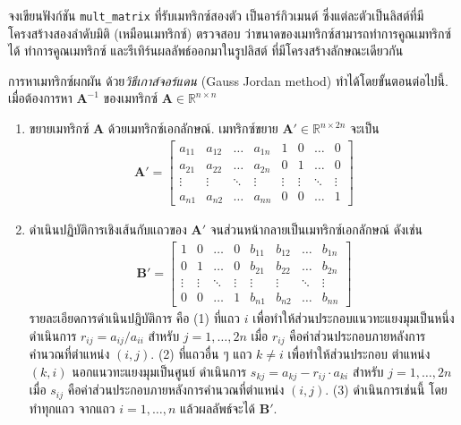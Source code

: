\begin{Exercise}
	\label{ex: linalg matrix mult python}
	
	จงเขียนฟังก์ชัน \verb|mult_matrix| ที่รับเมทริกซ์สองตัว 
	เป็นอาร์กิวเมนต์ ซึ่งแต่ละตัวเป็นลิสต์ที่มีโครงสร้างสองลำดับมิติ (เหมือนเมทริกซ์)
	ตรวจสอบ
	ว่าขนาดของเมทริกซ์สามารถทำการคูณเมทริกซ์ได้
	ทำการคูณเมทริกซ์
	และรีเทิร์นผลลัพธ์ออกมาในรูปลิสต์
	ที่มีโครงสร้างลักษณะเดียวกัน
	
\end{Exercise}


\begin{Exercise}
	\label{ex: linalg mat inverse}
	การหาเมทริกซ์ผกผัน ด้วย\textit{วิธีเกาส์จอร์แดน} (Gauss Jordan method) ทำได้โดยขั้นตอนต่อไปนี้.
	เมื่อต้องการหา $\bm{A}^{-1}$ ของเมทริกซ์ $\bm{A} \in \mathbb{R}^{n \times n}$
	\begin{enumerate}
		\item ขยายเมทริกซ์ $\bm{A}$ ด้วยเมทริกซ์เอกลักษณ์.
		เมทริกซ์ขยาย $\bm{A}' \in \mathbb{R}^{n \times 2n}$ จะเป็น
		\begin{eqnarray}
		\bm{A}' = \begin{bmatrix}
		a_{11} & a_{12} & \ldots & a_{1n} & 1 & 0 & \ldots & 0
		\\
		a_{21} & a_{22} & \ldots & a_{2n} & 0 & 1 & \ldots & 0
		\\
		\vdots & \vdots & \ddots & \vdots &
		\vdots & \vdots &
		\ddots & \vdots 
		\\
		a_{n1} & a_{n2} & \ldots & a_{nn} & 0 & 0 & \ldots & 1		
		\end{bmatrix}
		\label{eq: augmented matrix}
		\end{eqnarray}
		\item ดำเนินปฏิบัติการเชิงเส้นกับแถวของ $\bm{A}'$ 
		จนส่วนหน้ากลายเป็นเมทริกซ์เอกลักษณ์ ดังเช่น
		\begin{eqnarray}
		\bm{B}' = \begin{bmatrix}
		1 & 0 & \ldots & 0
		&
		b_{11} & b_{12} & \ldots & b_{1n} 
		\\
		0 & 1 & \ldots & 0
		&
		b_{21} & b_{22} & \ldots & b_{2n}
		\\
		\vdots & \vdots & \ddots & \vdots &
		\vdots & \vdots &
		\ddots & \vdots 
		\\
		0 & 0 & \ldots & 1
		&
		b_{n1} & b_{n2} & \ldots & b_{nn}		
		\end{bmatrix}
		\label{eq: linear transformed augmented matrix}
		\end{eqnarray}
		รายละเอียดการดำเนินปฎิบัติการ
		คือ 
		(1) 
		ที่แถว $i$ 
		เพื่อทำให้ส่วนประกอบแนวทะแยงมุมเป็นหนึ่ง
		ดำเนินการ $r_{ij} = a_{ij}/a_{ii}$ สำหรับ $j = 1, \ldots, 2n$
		เมื่อ $r_{ij}$ คือค่าส่วนประกอบภายหลังการคำนวณที่ตำแหน่ง $(i,j)$.
		(2)
		ที่แถวอื่น ๆ แถว $k \neq i$
		เพื่อทำให้ส่วนประกอบ ตำแหน่ง $(k,i)$ นอกแนวทะแยงมุมเป็นศูนย์
		ดำเนินการ $s_{kj} = a_{kj} - r_{ij} \cdot a_{ki}$
		สำหรับ $j = 1, \ldots, 2n$
		เมื่อ $s_{ij}$ คือค่าส่วนประกอบภายหลังการคำนวณที่ตำแหน่ง $(i,j)$.
		(3) ดำเนินการเช่นนี้ โดยทำทุกแถว จากแถว $i = 1, \ldots, n$
		แล้วผลลัพธ์จะได้ $\bm{B}'$.
		

\end{enumerate}
\end{Exercise}
